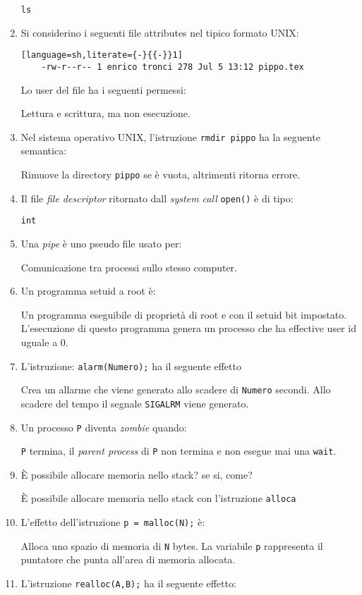 \documentclass[a4paper,twoside]{article}
\newcommand{\code}[1]{\texttt{#1}}
\begin{document}
\begin{enumerate}
    \code{ls}
    \item Si considerino i seguenti file attributes nel tipico formato UNIX: 
    \begin{lstlisting}[language=sh,literate={-}{{-}}1]
    -rw-r--r-- 1 enrico tronci 278 Jul 5 13:12 pippo.tex
    \end{lstlisting}
    Lo user del file ha i seguenti permessi:

    Lettura e scrittura, ma non esecuzione. 
    \item Nel sistema operativo UNIX, l'istruzione \code{rmdir pippo} ha la seguente semantica: 

    Rimuove la directory \code{pippo} se \`e vuota, altrimenti ritorna errore. 
    \item Il file \emph{file descriptor} ritornato dall \emph{system call} \code{open()} \`e di tipo:

    \code{int}
    \item Una \emph{pipe} \`e uno pseudo file usato per: 

    Comunicazione tra processi sullo stesso computer. 
    \item Un programma setuid a root \`e:

    Un programma eseguibile di propriet\`a di root e con il setuid bit impostato. L'esecuzione di questo programma genera un processo che ha effective user id uguale a 0. 
    \item L'istruzione: \code{alarm(Numero);} ha il seguente effetto

    Crea un allarme che viene generato allo scadere di \code{Numero} secondi. Allo scadere del tempo il segnale \code{SIGALRM} viene generato.
    \item Un processo \code{P} diventa \emph{zombie} quando: 

    \code{P} termina, il \emph{parent process} di \code{P} non termina e non esegue mai una \code{wait}. 

    \item È possibile allocare memoria nello stack? se si, come?

    È possibile allocare memoria nello stack con l'istruzione \code{alloca}
    \item L'effetto dell'istruzione \code{p = malloc(N);} \`e:

    Alloca  uno spazio di memoria di \code{N} bytes. La variabile \code{p} rappresenta il puntatore che punta all'area di memoria allocata.
    \item L'istruzione \code{realloc(A,B);} ha il seguente effetto:


\end{enumerate}
\end{document}
